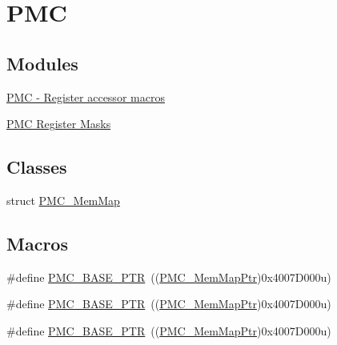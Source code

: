\hypertarget{group___p_m_c___peripheral}{}\section{P\+MC}
\label{group___p_m_c___peripheral}
\subsection*{Modules}
\begin{DoxyCompactItemize}
\item 
\hyperlink{group___p_m_c___register___accessor___macros}{P\+M\+C -\/ Register accessor macros}
\item 
\hyperlink{group___p_m_c___register___masks}{P\+M\+C Register Masks}
\end{DoxyCompactItemize}
\subsection*{Classes}
\begin{DoxyCompactItemize}
\item 
struct \hyperlink{struct_p_m_c___mem_map}{P\+M\+C\+\_\+\+Mem\+Map}
\end{DoxyCompactItemize}
\subsection*{Macros}
\begin{DoxyCompactItemize}
\item 
\#define \hyperlink{group___p_m_c___peripheral_gaf32df9f1096263f10a5e8978a338b2ac}{P\+M\+C\+\_\+\+B\+A\+S\+E\+\_\+\+P\+TR}~((\hyperlink{group___p_m_c___peripheral_ga0e73f22a2fa26cbb012851719e34812e}{P\+M\+C\+\_\+\+Mem\+Map\+Ptr})0x4007\+D000u)
\item 
\#define \hyperlink{group___p_m_c___peripheral_gaf32df9f1096263f10a5e8978a338b2ac}{P\+M\+C\+\_\+\+B\+A\+S\+E\+\_\+\+P\+TR}~((\hyperlink{group___p_m_c___peripheral_ga0e73f22a2fa26cbb012851719e34812e}{P\+M\+C\+\_\+\+Mem\+Map\+Ptr})0x4007\+D000u)
\item 
\#define \hyperlink{group___p_m_c___peripheral_gaf32df9f1096263f10a5e8978a338b2ac}{P\+M\+C\+\_\+\+B\+A\+S\+E\+\_\+\+P\+TR}~((\hyperlink{group___p_m_c___peripheral_ga0e73f22a2fa26cbb012851719e34812e}{P\+M\+C\+\_\+\+Mem\+Map\+Ptr})0x4007\+D000u)
\end{DoxyCompactItemize}
